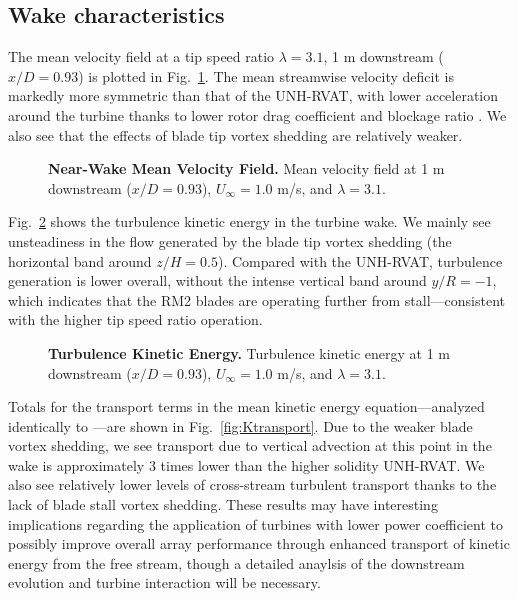\documentclass[10pt,letterpaper]{article}
\begin{document}
\subsection*{Wake characteristics}

The mean velocity field at a tip speed ratio $\lambda=3.1$, 1 m downstream
($x/D=0.93$) is plotted in Fig.~\ref{fig:meancontquiv}. The mean streamwise
velocity deficit is markedly more symmetric than that of the UNH-RVAT, with
lower acceleration around the turbine thanks to lower rotor drag coefficient and
blockage ratio \cite{Bachant2015-JoT}. We also see that the effects of blade tip
vortex shedding are relatively weaker.

\begin{figure}[h]
\caption{{\bf Near-Wake Mean Velocity Field.}
Mean velocity field at 1 m downstream ($x/D=0.93$), $U_\infty=1.0$ m/s, and
$\lambda=3.1$.}
\label{fig:meancontquiv}
\end{figure}


Fig.~\ref{fig:kcont} shows the turbulence kinetic energy in the turbine wake. We
mainly see unsteadiness in the flow generated by the blade tip vortex shedding
(the horizontal band around $z/H=0.5$). Compared with the UNH-RVAT, turbulence
generation is lower overall, without the intense vertical band around $y/R=-1$,
which indicates that the RM2 blades are operating further from
stall---consistent with the higher tip speed ratio operation.

\begin{figure}[h]
\caption{{\bf Turbulence Kinetic Energy.}
Turbulence kinetic energy at 1 m downstream ($x/D=0.93$), $U_\infty=1.0$ m/s, and
$\lambda=3.1$.}
\label{fig:kcont}
\end{figure}


Totals for the transport terms in the mean kinetic energy equation---analyzed
identically to \cite{Bachant2015-JoT}---are shown in Fig.~\ref{fig:Ktransport}.
Due to the weaker blade vortex shedding, we see transport due to vertical
advection at this point in the wake is approximately 3 times lower than the
higher solidity UNH-RVAT. We also see relatively lower levels of cross-stream
turbulent transport thanks to the lack of blade stall vortex shedding. These
results may have interesting implications regarding the application of turbines
with lower power coefficient to possibly improve overall array performance
through enhanced transport of kinetic energy from the free stream, though a
detailed anaylsis of the downstream evolution and turbine interaction will be
necessary.
\end{document}

